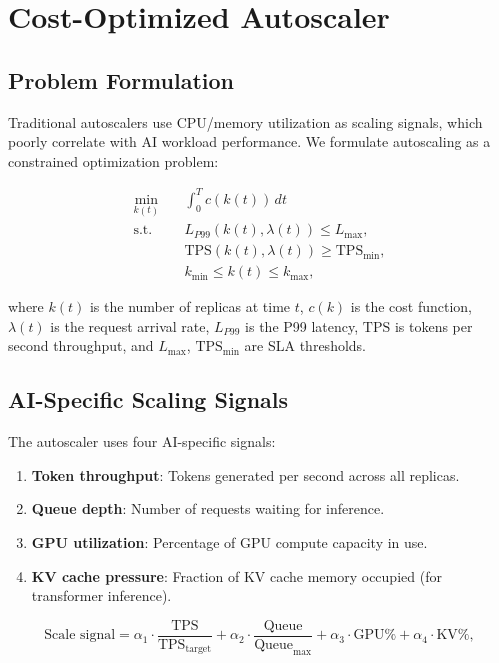 \section{Cost-Optimized Autoscaler}

\label{sec:autoscaler}

\subsection{Problem Formulation}

Traditional autoscalers use CPU/memory utilization as scaling signals, which poorly correlate with AI workload performance. We formulate autoscaling as a constrained optimization problem:

\begin{align}
\min_{k(t)} \quad & \int_0^T c(k(t)) \, dt \label{eq:autoscale} \\
\text{s.t.} \quad & L_{P99}(k(t), \lambda(t)) \le L_{\max}, \nonumber \\
& \text{TPS}(k(t), \lambda(t)) \ge \text{TPS}_{\min}, \nonumber \\
& k_{\min} \le k(t) \le k_{\max}, \nonumber
\end{align}

where $k(t)$ is the number of replicas at time $t$, $c(k)$ is the cost function, $\lambda(t)$ is the request arrival rate, $L_{P99}$ is the P99 latency, $\text{TPS}$ is tokens per second throughput, and $L_{\max}$, $\text{TPS}_{\min}$ are SLA thresholds.

\subsection{AI-Specific Scaling Signals}

The autoscaler uses four AI-specific signals:

\begin{enumerate}[leftmargin=1.4em]
    \item \textbf{Token throughput}: Tokens generated per second across all replicas.
    \item \textbf{Queue depth}: Number of requests waiting for inference.
    \item \textbf{GPU utilization}: Percentage of GPU compute capacity in use.
    \item \textbf{KV cache pressure}: Fraction of KV cache memory occupied (for transformer inference).
\end{enumerate}

\begin{equation}
\text{Scale signal} = \alpha_1 \cdot \frac{\text{TPS}}{\text{TPS}_{\text{target}}} + \alpha_2 \cdot \frac{\text{Queue}}{\text{Queue}_{\max}} + \alpha_3 \cdot \text{GPU\%} + \alpha_4 \cdot \text{KV\%},
\end{equation}

